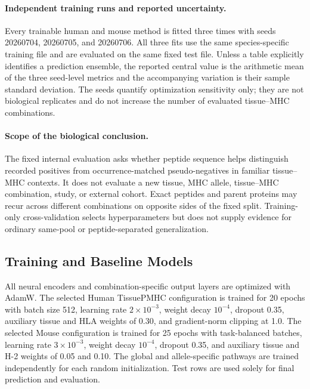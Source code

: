 \paragraph{Independent training runs and reported uncertainty.}
Every trainable human and mouse method is fitted three times with seeds 20260704, 20260705, and 20260706. All three fits use the same species-specific training file and are evaluated on the same fixed test file. Unless a table explicitly identifies a prediction ensemble, the reported central value is the arithmetic mean of the three seed-level metrics and the accompanying variation is their sample standard deviation. The seeds quantify optimization sensitivity only; they are not biological replicates and do not increase the number of evaluated tissue--MHC combinations.

\paragraph{Scope of the biological conclusion.}
The fixed internal evaluation asks whether peptide sequence helps distinguish recorded positives from occurrence-matched pseudo-negatives in familiar tissue--MHC contexts. It does not evaluate a new tissue, MHC allele, tissue--MHC combination, study, or external cohort. Exact peptides and parent proteins may recur across different combinations on opposite sides of the fixed split. Training-only cross-validation selects hyperparameters but does not supply evidence for ordinary same-pool or peptide-separated generalization.

\subsection{Training and Baseline Models}

All neural encoders and combination-specific output layers are optimized with AdamW. The selected Human TissuePMHC configuration is trained for 20 epochs with batch size 512, learning rate \(2\times10^{-3}\), weight decay \(10^{-4}\), dropout 0.35, auxiliary tissue and HLA weights of 0.30, and gradient-norm clipping at 1.0. The selected Mouse configuration is trained for 25 epochs with task-balanced batches, learning rate \(3\times10^{-3}\), weight decay \(10^{-4}\), dropout 0.35, and auxiliary tissue and H-2 weights of 0.05 and 0.10. The global and allele-specific pathways are trained independently for each random initialization. Test rows are used solely for final prediction and evaluation.

